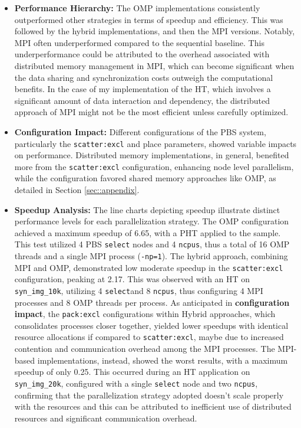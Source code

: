 \documentclass[conference]{IEEEtran}
\begin{document}
    \begin{itemize}

        \item \textbf{Performance Hierarchy:} The OMP implementations consistently outperformed other strategies in terms of speedup and efficiency. This was followed by the hybrid implementations, and then the MPI versions. Notably, MPI often underperformed compared to the sequential baseline. This underperformance could be attributed to the overhead associated with distributed memory management in MPI, which can become significant when the data sharing and synchronization costs outweigh the computational benefits. In the case of my implementation of the HT, which involves a significant amount of data interaction and dependency, the distributed approach of MPI might not be the most efficient unless carefully optimized.

        \item \textbf{Configuration Impact:} Different configurations of the PBS system, particularly the \texttt{scatter:excl} and  place parameters, showed variable impacts on performance. Distributed memory implementations, in general, benefited more from the \texttt{scatter:excl} configuration, enhancing node level parallelism, while the   configuration favored shared memory approaches like OMP, as detailed in Section \ref{sec::appendix}.

        \item \textbf{Speedup Analysis:} The line charts depicting speedup illustrate distinct performance levels for each parallelization strategy. The OMP configuration achieved a maximum speedup of 6.65, with a PHT applied to the  sample. This test utilized 4 PBS \texttt{select} nodes and 4 \texttt{ncpus}, thus a total of 16 OMP threads and a single MPI process (\texttt{-np=1}). 
        The hybrid approach, combining MPI and OMP, demonstrated low moderate speedup in the \texttt{scatter:excl} configuration, peaking at 2.17. This was observed with an HT on \texttt{syn\_img\_10k}, utilizing 4 \texttt{select}and 8 \texttt{ncpus}, thus configuring 4 MPI processes and 8 OMP threads per process. As anticipated in \textbf{configuration impact}, the \texttt{pack:excl} configurations within Hybrid approaches, which consolidates processes closer together, yielded lower speedups with identical resource allocations if compared to \texttt{scatter:excl}, maybe due to increased contention and communication overhead among the MPI processes. The MPI-based implementations, instead, showed the worst results, with a maximum speedup of only 0.25. This occurred during an HT application on \texttt{syn\_img\_20k}, configured with a single \texttt{select} node and two \texttt{ncpus}, confirming that the parallelization strategy adopted doesn't scale properly with the resources and this can be attributed to inefficient use of distributed resources and significant communication overhead.
    

\end{itemize}
\end{document}
